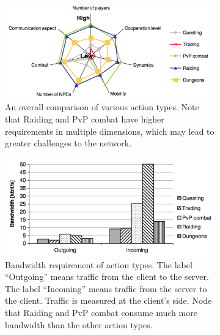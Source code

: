 \documentclass{article}
\begin{document}
\begin{figure}
\begin{center}
\begin{subfigure}[b]{\textwidth}
	\begin{center}
	\includegraphics[scale=0.3]{images/actstar.png}
	\caption{An overall comparison of various action types. Note that Raiding and PvP combat have higher requirements in multiple dimensions, which may lead to greater challenges to the network.}
	\label{actstar}
	\end{center}
\end{subfigure}
\begin{subfigure}[b]{\textwidth}
	\begin{center}
	\includegraphics[scale=0.25]{images/actbw.png}
	\caption{Bandwidth requirement of action types. The label ``Outgoing'' means traffic from the client to the server. The label ``Incoming'' means traffic from the server to the client. Traffic is measured at the client's side. Node that Raiding and PvP combat consume much more bandwidth than the other action types.}
	\label{actbw}
	\end{center}
\end{subfigure}
\begin{subfigure}[b]{\textwidth}
	\begin{center}

\end{center}
\end{subfigure}
\end{center}
\end{figure}
\end{document}

